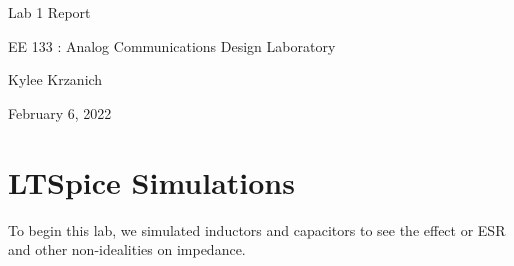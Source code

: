 \documentclass[12pt]{article}
\begin{document}
\begin{titlepage}
   \begin{center}
        \vspace*{5cm}

        \Huge{Lab 1 Report}

        \vspace{0.5cm}
        \LARGE{EE 133 : Analog Communications Design Laboratory}
            
        \vspace{3 cm}
        \Large{Kylee Krzanich}
       
        \vspace{0.05 cm}
        \Large{February 6, 2022}
        
       

       \vfill
    \end{center}
\end{titlepage}

\setcounter{page}{2}
\pagestyle{fancy}
\fancyhf{}
\rhead{\thepage}

\section*{LTSpice Simulations}
To begin this lab, we simulated inductors and capacitors to see the effect or ESR and other non-idealities on impedance. 
\end{document}
